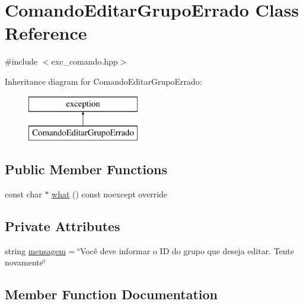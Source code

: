 \hypertarget{classComandoEditarGrupoErrado}{}\section{Comando\+Editar\+Grupo\+Errado Class Reference}
\label{classComandoEditarGrupoErrado}


{\ttfamily \#include $<$exc\+\_\+comando.\+hpp$>$}

Inheritance diagram for Comando\+Editar\+Grupo\+Errado\+:\begin{figure}[H]
\begin{center}
\leavevmode
\includegraphics[height=2.000000cm]{classComandoEditarGrupoErrado}
\end{center}
\end{figure}
\subsection*{Public Member Functions}
\begin{DoxyCompactItemize}
\item 
const char $\ast$ \hyperlink{classComandoEditarGrupoErrado_a76dd1929368b3b0d0cc1443cd5a98bb6}{what} () const noexcept override
\end{DoxyCompactItemize}
\subsection*{Private Attributes}
\begin{DoxyCompactItemize}
\item 
string \hyperlink{classComandoEditarGrupoErrado_a9055ba079abfac17438aece597eb90d8}{mensagem} = \char`\"{}Você deve informar o ID do grupo que deseja editar. Tente novamente\char`\"{}
\end{DoxyCompactItemize}


\subsection{Member Function Documentation}
\mbox{\label{classComandoEditarGrupoErrado_a76dd1929368b3b0d0cc1443cd5a98bb6}} 
